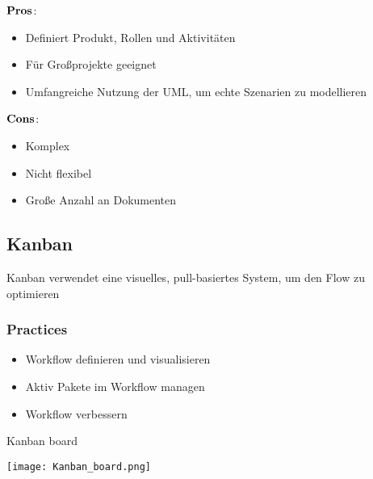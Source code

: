 \begin{multicols}{2}
$\bold{Pros}$:
\begin{itemize}
	\item Definiert Produkt, Rollen und Aktivitäten
	\item Für Großprojekte geeignet
	\item Umfangreiche Nutzung der UML, um echte Szenarien zu modellieren
\end{itemize}	
\columnbreak
$\bold{Cons}$:
\begin{itemize}
	\item Komplex
	\item Nicht flexibel
	\item Große Anzahl an Dokumenten
\end{itemize}
\end{multicols}
\subsection{Kanban}
Kanban verwendet eine visuelles, pull-basiertes System, um den Flow zu optimieren
\subsubsection{Practices}
\begin{itemize}
	\item Workflow definieren und visualisieren
	\item Aktiv Pakete im Workflow managen
	\item Workflow verbessern
\end{itemize}
\begin{table}[H]
\caption{Kanban board}
\texttt{[image: Kanban\_board.png]}
\end{table}








